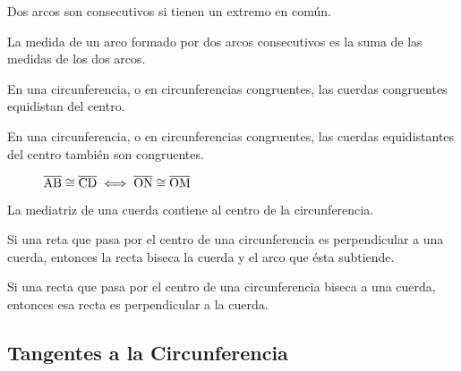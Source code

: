 \begin{definition}
    Dos arcos son consecutivos si tienen un extremo en común.
\end{definition}

\begin{postulate}
    La medida de un arco formado por dos arcos consecutivos es la suma de las medidas de los dos arcos.
\end{postulate}

\begin{theorem}
    En una circunferencia, o en circunferencias congruentes, las cuerdas congruentes equidistan del centro.
\end{theorem}

\clearpage

\begin{theorem}
    En una circunferencia, o en circunferencias congruentes, las cuerdas equidistantes del centro también son congruentes.
\end{theorem}


\begin{figure}[!h]
    \centering
    
    \caption{$\overline{\rm AB} \cong \overline{\rm CD} \iff \overline{\rm ON} \cong \overline{\rm OM}$}
    \label{fig:equidistante-al-centro-cuerdas-congruentes}
\end{figure}

\begin{theorem}
    La mediatriz de una cuerda contiene al centro de la circunferencia.
\end{theorem}

\begin{theorem}
    Si una reta que pasa por el centro de una circunferencia es perpendicular a una cuerda, entonces la recta biseca la cuerda y el arco que ésta subtiende.
\end{theorem}

\begin{theorem}
    Si una recta que pasa por el centro de una circunferencia biseca a una cuerda, entonces esa recta es perpendicular a la cuerda.
\end{theorem}

\begin{figure}[!h]
    \centering
    
    \label{fig:circulo-cuerda-bisectriz}
\end{figure}

\clearpage

\subsection{Tangentes a la Circunferencia}

